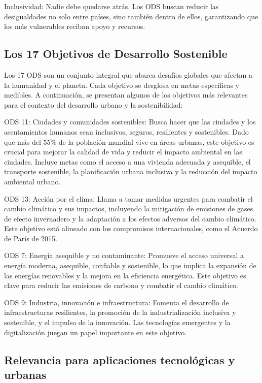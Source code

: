 	Inclusividad: Nadie debe quedarse atrás. Los ODS buscan reducir las desigualdades no solo entre países, sino también dentro de ellos, garantizando que los más vulnerables reciban apoyo y recursos.
	
	\subsection{Los 17 Objetivos de Desarrollo Sostenible}
	
	Los 17 ODS son un conjunto integral que abarca desafíos globales que afectan a la humanidad y el planeta. Cada objetivo se desglosa en metas específicas y medibles. A continuación, se presentan algunos de los objetivos más relevantes para el contexto del desarrollo urbano y la sostenibilidad:
	
	ODS 11: Ciudades y comunidades sostenibles: Busca hacer que las ciudades y los asentamientos humanos sean inclusivos, seguros, resilientes y sostenibles. Dado que más del 55\% de la población mundial vive en áreas urbanas, este objetivo es crucial para mejorar la calidad de vida y reducir el impacto ambiental en las ciudades. Incluye metas como el acceso a una vivienda adecuada y asequible, el transporte sostenible, la planificación urbana inclusiva y la reducción del impacto ambiental urbano.
	
	ODS 13: Acción por el clima: Llama a tomar medidas urgentes para combatir el cambio climático y sus impactos, incluyendo la mitigación de emisiones de gases de efecto invernadero y la adaptación a los efectos adversos del cambio climático. Este objetivo está alineado con los compromisos internacionales, como el Acuerdo de París de 2015.
	
	ODS 7: Energía asequible y no contaminante: Promueve el acceso universal a energía moderna, asequible, confiable y sostenible, lo que implica la expansión de las energías renovables y la mejora en la eficiencia energética. Este objetivo es clave para reducir las emisiones de carbono y combatir el cambio climático.
	
	ODS 9: Industria, innovación e infraestructura: Fomenta el desarrollo de infraestructuras resilientes, la promoción de la industrialización inclusiva y sostenible, y el impulso de la innovación. Las tecnologías emergentes y la digitalización juegan un papel importante en este objetivo.
	
	\subsection{Relevancia para aplicaciones tecnológicas y urbanas}
	
